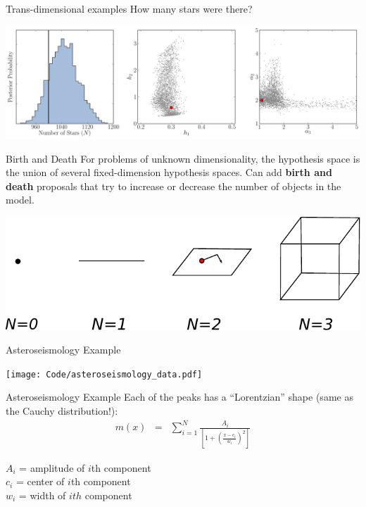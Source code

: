 \begin{frame}[t]{Trans-dimensional examples}
How many stars were there?
\begin{center}
\includegraphics[scale=0.25]{inference2.pdf}
\end{center}

\end{frame}

\begin{frame}[t]{Birth and Death}
For problems of unknown dimensionality, the hypothesis space is the union
of several fixed-dimension hypothesis spaces. Can add {\bf birth and death}
proposals that try to increase or decrease the number of objects in the model.

\begin{center}
\includegraphics[scale=0.7]{drawing.pdf}
\end{center}

\end{frame}

\begin{frame}[t]{Asteroseismology Example}

\begin{center}
\texttt{[image: Code/asteroseismology\_data.pdf]}
\end{center}

\end{frame}


\begin{frame}[t]{Asteroseismology Example}
Each of the peaks has a ``Lorentzian'' shape
(same as the Cauchy distribution!):
\begin{eqnarray}
m(x) &=& \sum_{i=1}^N \frac{A_i}
{\left[1 + \left(\frac{x - c_i}{w_i}\right)^2\right]} 
\end{eqnarray}

$A_i$ = amplitude of $i$th component\\
$c_i$ = center of $i$th component\\
$w_i$ = width of $ith$ component\\


\end{frame}


